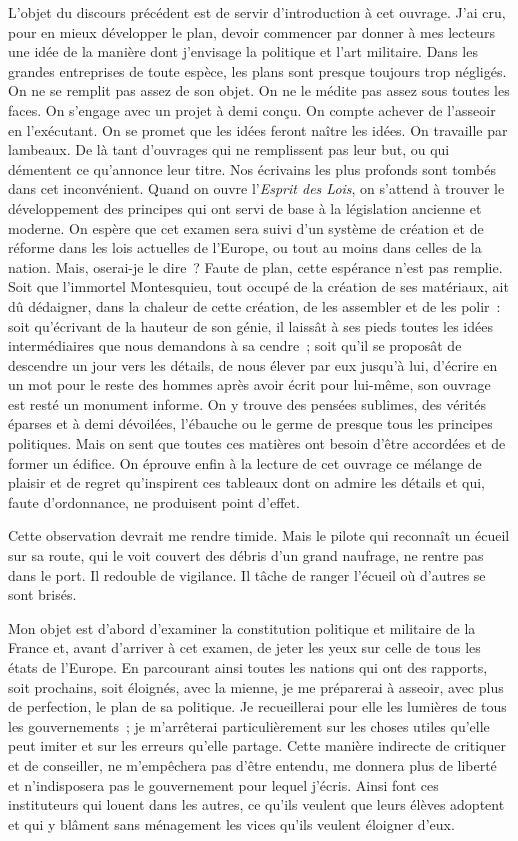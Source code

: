 \documentclass[french,twoside]{book} %
\begin{document}
\noindent L’objet du discours précédent est de servir d’introduction à cet ouvrage. J’ai cru, pour en mieux développer le plan, devoir commencer par donner à mes lecteurs une idée de la manière dont j’envisage la politique et l’art militaire. Dans les grandes entreprises de toute espèce, les plans sont presque toujours trop négligés. On ne se remplit pas assez de son objet. On ne le médite pas assez sous toutes les faces. On s’engage avec un projet à demi conçu. On compte achever de l’asseoir en l’exécutant. On se promet que les idées feront naître les idées. On travaille par lambeaux. De là tant d’ouvrages qui ne remplissent pas leur but, ou qui démentent ce qu’annonce leur titre. Nos écrivains les plus profonds sont tombés dans cet inconvénient. Quand on ouvre l’{\itshape Esprit des Lois}, on s’attend à trouver le développement des principes qui ont servi de base à la législation ancienne et moderne. On espère que cet examen sera suivi d’un système de création et de réforme dans les lois actuelles de l’Europe, ou tout au moins dans celles de la nation. Mais, oserai-je le dire ? Faute de plan, cette espérance n’est pas remplie. Soit que l’immortel Montesquieu, tout occupé de la création de ses matériaux, ait dû dédaigner, dans la chaleur de cette création, de les assembler et de les polir : soit qu’écrivant de la hauteur de son génie, il laissât à ses pieds toutes les idées intermédiaires que nous demandons à sa cendre ; soit qu’il se proposât de descendre un jour vers les détails, de nous élever par eux jusqu’à lui, d’écrire en un mot pour le reste des hommes après avoir écrit pour lui-même, son ouvrage est resté un monument informe. On y trouve des pensées sublimes, des vérités éparses et à demi dévoilées, l’ébauche ou le germe de presque tous les principes politiques. Mais on sent que toutes ces matières ont besoin d’être accordées et de former un édifice. On éprouve enfin à la lecture de cet ouvrage ce mélange de plaisir et de regret qu’inspirent ces tableaux dont on admire les détails et qui, faute d’ordonnance, ne produisent point d’effet.\par
Cette observation devrait me rendre timide. Mais le pilote qui reconnaît un écueil sur sa route, qui le voit couvert des débris d’un grand naufrage, ne rentre pas dans le port. Il redouble de vigilance. Il tâche de ranger l’écueil où d’autres se sont brisés.\par
Mon objet est d’abord d’examiner la constitution politique et militaire de la France et, avant d’arriver à cet examen, de jeter les yeux sur celle de tous les états de l’Europe. En parcourant ainsi toutes les nations qui ont des rapports, soit prochains, soit éloignés, avec la mienne, je me préparerai à asseoir, avec plus de perfection, le plan de sa politique. Je recueillerai pour elle les lumières de tous les gouvernements ; je m’arrêterai particulièrement sur les choses utiles qu’elle peut imiter et sur les erreurs qu’elle partage. Cette manière indirecte de critiquer et de conseiller, ne m’empêchera pas d’être entendu, me donnera plus de liberté et n’indisposera pas le gouvernement pour lequel j’écris. Ainsi font ces instituteurs qui louent dans les autres, ce qu’ils veulent que leurs élèves adoptent et qui y blâment sans ménagement les vices qu’ils veulent éloigner d’eux.\par
\end{document}
